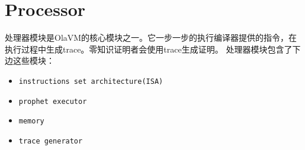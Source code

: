 \section{Processor}\label{sec: processor}
处理器模块是OlaVM的核心模块之一。它一步一步的执行编译器提供的指令，在执行过程中生成trace。零知识证明者会使用trace生成证明。
处理器模块包含了下边这些模块：
\begin{itemize}
    \item \verb|instructions set architecture(ISA)|
    \item \verb|prophet executor|
    \item \verb|memory|
    \item \verb|trace generator|
\end{itemize}





